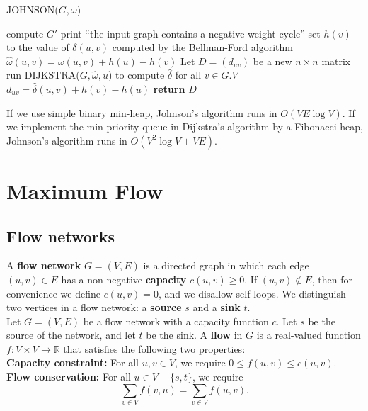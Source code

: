 \documentclass[12pt]{article}
\begin{document}
JOHNSON($G, \omega$)
\begin{algorithmic} [1]
\State compute $G'$
	\State print ``the input graph contains a negative-weight cycle''
\Else
		\State set $h(v)$ to the value of $\delta(u,v)$ computed by the Bellman-Ford algorithm
        \EndFor
		\State $\hat{\omega}(u,v) = \omega(u,v) + h(u) - h(v)$
        \EndFor
        \State Let $D = (d_{uv})$ be a new $n \times n$ matrix
		\State run DIJKSTRA($G, \hat{\omega}, u$) to compute $\hat{\delta}$ for all $v \in G.V$
			\State $d_{uv} = \hat{\delta}(u,v) + h(v) - h(u)$
                \EndFor
        \EndFor
        \State \textbf{return } $D$
\EndIf
\end{algorithmic}

If we use simple binary min-heap, Johnson's algorithm runs in $O(VE \log V)$. If we implement the min-priority queue in Dijkstra's algorithm by a Fibonacci heap, Johnson's algorithm runs in $O(V^2 \log V + VE)$.

\section{Maximum Flow}

\subsection{Flow networks}

A \textbf{flow network} $G = (V,E)$ is a directed graph in which each edge $(u,v) \in E$ has a non-negative \textbf{capacity} $c(u,v) \ge 0$. If $(u,v) \notin E$, then for convenience we define $c(u,v) = 0$, and we disallow self-loops. We distinguish two vertices in a flow network: a \textbf{source} $s$ and a \textbf{sink} $t$. \\

Let $G = (V,E)$ be a flow network with a capacity function $c$. Let $s$ be the source of the network, and let $t$ be the sink. A \textbf{flow} in $G$ is a real-valued function $f : V \times V \rightarrow \mathbb{R}$ that satisfies the following two properties: \\

\textbf{Capacity constraint:} For all $u,v \in V$, we require $0 \le f(u,v) \le c(u,v)$. \\

\textbf{Flow conservation:} For all $u \in V - \{ s,t \}$, we require
\begin{equation*}
  \sum_{v \in V} f(v,u) = \sum_{v \in V} f(u,v).
\end{equation*}
\end{document}
